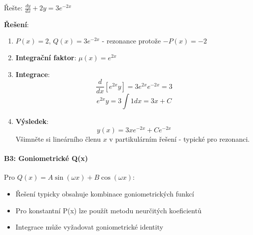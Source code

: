 \vspace{0.6\baselineskip}

\begin{example}
Řešte: $\frac{dy}{dx} + 2y = 3e^{-2x}$
\vspace{0.3\baselineskip}

\textbf{Řešení}: 
\begin{enumerate}
\item $P(x) = 2$, $Q(x) = 3e^{-2x}$ - rezonance protože $-P(x) = -2$

\item \textbf{Integrační faktor}: $\mu(x) = e^{2x}$

\item \textbf{Integrace}:
\[
\frac{d}{dx}[e^{2x}y] = 3e^{2x}e^{-2x} = 3
\]
\[
e^{2x}y = 3\int 1  dx = 3x + C
\]

\item \textbf{Výsledek}:
\[
y(x) = 3xe^{-2x} + Ce^{-2x}
\]
Všimněte si lineárního členu $x$ v partikulárním řešení - typické pro rezonanci.
\end{enumerate}
\end{example}

\vspace{0.8\baselineskip}

\paragraph*{B3: Goniometrické Q(x)}

\begin{remark}
Pro $Q(x) = A\sin(\omega x) + B\cos(\omega x)$:
\begin{itemize}
\item Řešení typicky obsahuje kombinace goniometrických funkcí
\item Pro konstantní P(x) lze použít metodu neurčitých koeficientů
\item Integrace může vyžadovat goniometrické identity
\end{itemize}
\end{remark}

\vspace{0.6\baselineskip}

